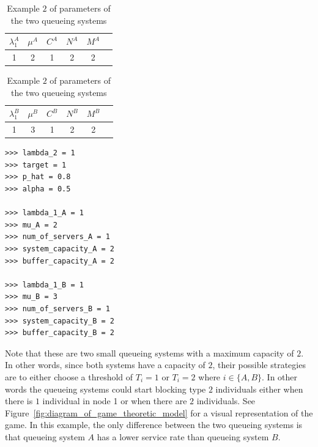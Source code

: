 \begin{table}[H]
    \caption{Example \(2\) of parameters of the two queueing systems}
    \begin{center}
        \begin{tabular}{||c|c|c|c|c|c||}
            \hline
            \(\lambda_1^A\) & \(\mu^A\) & \(C^A\) & \(N^A\) & \(M^A\) \\
            \hline
            1 & 2 & 1 & 2 & 2 \\
            \hline
        \end{tabular}

        \vspace{0.5cm}
        
        \begin{tabular}{||c|c|c|c|c|c||}
            \hline
            \(\lambda_1^B\) & \(\mu^B\) & \(C^B\) & \(N^B\) & \(M^B\) \\
            \hline
            1 & 3 & 1 & 2 & 2 \\
            \hline
        \end{tabular}
    \end{center}
    \label{tab:solving_game_queueing_systems_parameters}
\end{table}

\begin{lstlisting}[style=pystyle]
>>> lambda_2 = 1
>>> target = 1
>>> p_hat = 0.8
>>> alpha = 0.5

>>> lambda_1_A = 1
>>> mu_A = 2
>>> num_of_servers_A = 1
>>> system_capacity_A = 2
>>> buffer_capacity_A = 2
    
>>> lambda_1_B = 1
>>> mu_B = 3
>>> num_of_servers_B = 1
>>> system_capacity_B = 2
>>> buffer_capacity_B = 2

\end{lstlisting}

Note that these are two small queueing systems with a maximum capacity of \(2\).
In other words, since both systems have a capacity of \(2\), their possible
strategies are to either choose a threshold of \(T_i = 1\) or \(T_i = 2\) where
\(i \in \{A, B\}\).
In other words the queueing systems could start blocking type \(2\) individuals
either when there is \(1\) individual in node 1 or when there are \(2\)
individuals.
See Figure~\ref{fig:diagram_of_game_theoretic_model} for a visual representation
of the game.
In this example, the only difference between the two queueing systems
is that queueing system \(A\) has a lower service rate than queueing system
\(B\).

